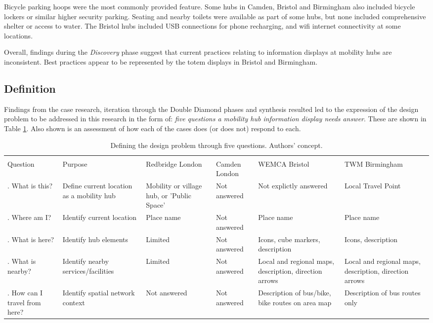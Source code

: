 \documentclass[preprint, 3p,
authoryear]{elsarticle} %
\begin{document}
Bicycle parking hoops were the most commonly provided feature. Some hubs
in Camden, Bristol and Birmingham also included bicycle lockers or
similar higher security parking. Seating and nearby toilets were
available as part of some hubs, but none included comprehensive shelter
or access to water. The Bristol hubs included USB connections for phone
recharging, and wifi internet connectivity at some locations.

Overall, findings during the \emph{Discovery} phase suggest that current
practices relating to information displays at mobility hubs are
inconsistent. Best practices appear to be represented by the totem
displays in Bristol and Birmingham.

\subsection{Definition}\label{definition}

Findings from the case research, iteration through the Double Diamond
phases and synthesis resulted led to the expression of the design
problem to be addressed in this research in the form of: \emph{five
questions a mobility hub information display needs answer}. These are
shown in Table \ref{tab:definition_details}. Also shown is an assessment
of how each of the cases does (or does not) respond to each.

\begingroup\fontsize{7}{9}\selectfont

\begin{longtable}[t]{>{\raggedright\arraybackslash}p{2.25cm}|>{\raggedright\arraybackslash}p{2.8cm}|>{\raggedright\arraybackslash}p{2.8cm}|>{\raggedright\arraybackslash}p{1.75cm}|>{\raggedright\arraybackslash}p{2.75cm}|>{\raggedright\arraybackslash}p{2.75cm}|}
\caption{\label{tab:definition_details}Defining the design problem through five questions. Authors' concept.}\\
\toprule
\multicolumn{2}{c}{Problem} & \multicolumn{4}{c}{Answers from cases} \\
\cmidrule(l{3pt}r{3pt}){1-2} \cmidrule(l{3pt}r{3pt}){3-6}
Question & Purpose & Redbridge London & Camden London & WEMCA Bristol & TWM Birmingham\\
\midrule
1. What is this? & Define current location as a mobility hub & Mobility or village hub, or 'Public Space' & Not answered & Not explictly answered & Local Travel Point\\
2. Where am I? & Identify current location & Place name & Not answered & Place name & Place name\\
3. What is here? & Identify hub elements & Limited & Not answered & Icons, cube markers, description & Icons, description\\
4. What is nearby? & Identify nearby services/facilities & Limited & Not answered & Local and regional maps, description, direction arrows & Local and regional maps, description, direction arrows\\
5. How can I travel from here? & Identify spatial network context & Not answered & Not answered & Description of bus/bike, bike routes on area map & Description of bus routes only\\
\bottomrule
\end{longtable}
\endgroup{}
\end{document}
